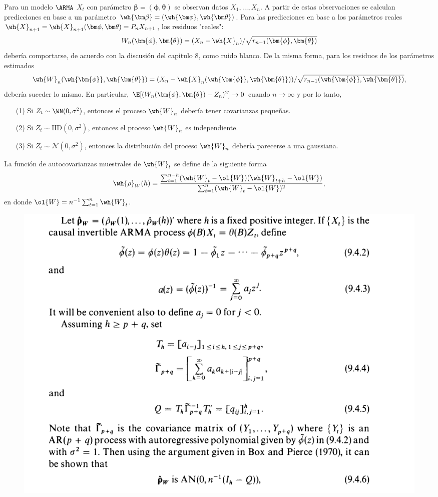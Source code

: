 Para un modelo $\ARMA$ $X_t$ con parámetro $\bm\beta = (\bm\phi,\bm\theta)$ se observan datos $X_1, \ldots, X_n$. A partir de estas observaciones se calculan predicciones en base a un parámetro $\wh{\bm\beta} = (\wh{\bm\phi},\wh{\bm\theta})$. Para las predicciones en base a los parámetros reales $\wh{X}_{n+1} = \wh{X}_{n+1}(\bm\phi,\bm\theta) = P_n X_{n+1}$, los residuos "reales":
\[ W_n(\bm{\phi},\bm{\theta}) = (X_{n}-\wh{X}_{n})/\sqrt{r_{n-1}(\bm{\phi},\bm{\theta})} \]
debería comportarse, de acuerdo con la discusión del capitulo 8, como ruido blanco. De la misma forma, para los residuos de los parámetros estimados
\[  \wh{W}_n(\wh{\bm{\phi}},\wh{\bm{\theta}}) = (X_{n}-\wh{X}_{n}(\wh{\bm{\phi}},\wh{\bm{\theta}}))/\sqrt{r_{n-1}(\wh{\bm{\phi}},\wh{\bm{\theta}})}, \]
debería suceder lo mismo. En particular, $\E[( W_n(\bm{\phi},\bm{\theta}) - Z_n)^2] \to 0$ cuando $n \to \infty$ y por lo tanto,
\begin{itemize}
    \item[(1)] Si $Z_t \sim \WN(0,\sigma^2)$, entonces el proceso $\wh{W}_n$ debería tener covarianzas pequeñas.
    \item[(2)] Si $Z_t \sim \mbox{IID}(0,\sigma^2)$, entonces el proceso $\wh{W}_n$ es independiente.
    \item[(3)] Si $Z_t \sim \mathcal{N}(0,\sigma^2)$, entonces la distribución del proceso $\wh{W}_n$ debería parecerse a una gaussiana.
\end{itemize}

La función de autocovarianzas muestrales de $\wh{W}_t$ se define de la siguiente forma
\[ \wh{\rho}_W(h) = \frac{\sum_{t = 1}^{n-h}(\wh{W}_{t} - \ol{W})(\wh{W}_{t+h}- \ol{W})}{\sum_{t = 1}^n (\wh{W}_t- \ol{W})^2}, \]
en donde $\ol{W} = n^{-1}\sum_{t = 1}^n \wh{W}_{t}$.

\begin{figure}[H]
    \centering
    \includegraphics[width=1\textwidth]{../pictures/image6.png}
\end{figure}

